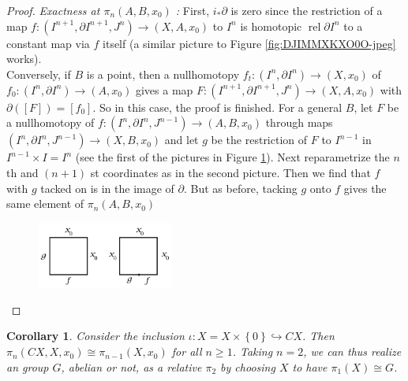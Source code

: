 \documentclass[reqno]{amsart}
\newtheorem{corollary}[theorem]{Corollary}
\theoremstyle{definition}
\theoremstyle{remark}
\DeclareMathOperator{\rel}{rel}
\begin{document}
\begin{proof}
      \textit{Exactness at $\pi_n (A,B,x_0)$ :} 
      First, $i_* \partial$ is zero since
      the restriction of a map
      $f \colon \left( I^{n+1}, \partial I^{n+1},
      J^{n}\right) \to \left( X,A,x_0 \right) $ 
      to $I^{n}$ is homotopic $\rel \partial I^{n}$ to a 
      constant map via $f$ itself (a similar picture
      to Figure \ref{fig:DJIMMXKXO0O-jpeg} works).\\
      Conversely, if $B$ is a point, then
      a nullhomotopy $f_t \colon
      \left( I^{n}, \partial I^{n} \right) 
      \to \left( X, x_0 \right) $ of
      $f_0 \colon \left( I^{n},\partial I^{n} \right) 
      \to \left( A,x_0 \right) $ gives a map
      $F \colon \left( I^{n+1},\partial I^{n+1},J^{n} \right) 
      \to \left( X,A,x_0 \right) $ with
      $\partial \left( \left[ F \right]  \right) 
      = \left[ f_0 \right] $. So in this case, the proof is
      finished.
      For a general $B$, let
      $F$ be a nullhomotopy of
      $f \colon \left( I^{n},\partial I^{n},J^{n-1} \right) 
      \to \left( A,B,x_0 \right) $ through maps
      $\left( I^{n}, \partial I^{n}, J^{n-1} \right) 
      \to \left( X,B,x_0 \right) $ and
      let $g$ be the restriction of
      $F$ to $I^{n-1}$ in $I^{n-1} \times I = I^{n}$ (see
      the first of the pictures in
      Figure \ref{fig:USIIOOQ-png}).
      Next reparametrize the $n$ th and
      $(n+1)$ st coordinates as in the
      second picture. Then 
       we find that $f$ with $g$ tacked on
       is in the image of $\partial$. But
       as before, tacking $g$ onto $f$ gives the
       same element of $\pi_n (A,B,x_0)$

      \begin{figure}[htpb]
          \centering
          \includegraphics[width=0.4\textwidth]{USIIOOQ.png}
          \caption{}
          \label{fig:USIIOOQ-png}
      \end{figure}
  \end{proof}

  
\begin{corollary}
    Consider the inclusion
    $\iota \colon X = X \times \left\{ 0 \right\} 
    \hookrightarrow CX$.
    Then
    $\pi_n \left( CX, X, x_0 \right) 
    \cong \pi_{n-1}\left( X, x_0 \right) $ for all
    $n\ge 1$. Taking
    $n=2$, we can thus realize an group $G$, abelian
    or not, as a relative $\pi_2$ by
    choosing $X$ to have $\pi_1 (X) \cong G$.
\end{corollary}
\end{document}
